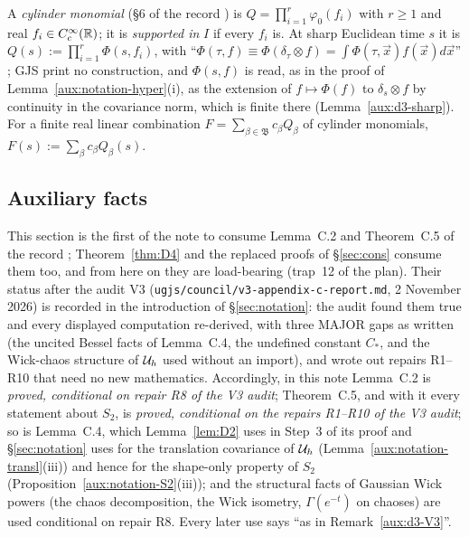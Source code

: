 A \emph{cylinder monomial} (\S6 of the record \cite[p.~19]{R}) is $Q=\prod_{i=1}^r\varphi_0(f_i)$
with $r\ge1$ and real $f_i\in C_c^\infty(\mathbb{R})$; it is \emph{supported in} $I$ if every $f_i$ is.
At sharp Euclidean time $s$ it is $Q(s):=\prod_{i=1}^r\Phi(s,f_i)$, with
``$\Phi(\tau,f)\equiv\Phi(\delta_\tau\otimes f)=\int\Phi(\tau,\vec x)f(\vec x)d\vec x$''
\cite[p.~589]{GJS}; GJS print no construction, and $\Phi(s,f)$ is read, as in the proof of
Lemma~\ref{aux:notation-hyper}(i), as the extension of $f\mapsto\Phi(f)$ to $\delta_s\otimes f$ by
continuity in the covariance norm, which is finite there (Lemma~\ref{aux:d3-sharp}).  For a finite
real linear combination $F=\sum_{\beta\in\mathfrak B}c_\beta Q_\beta$ of cylinder monomials,
$F(s):=\sum_\beta c_\beta Q_\beta(s)$.

\subsection{Auxiliary facts}\label{sub:d3-aux}

\begin{auxrem}\label{aux:d3-V3}
This section is the first of the note to consume Lemma~C.2 and Theorem~C.5 of the record
\cite[pp.~40--41]{R}; Theorem~\ref{thm:D4} and the replaced proofs of \S\ref{sec:cons} consume
them too, and from here on they are load-bearing (trap~12 of the plan).  Their status after the
audit V3 (\texttt{ugjs/council/}\allowbreak\texttt{v3-appendix-c-report.md}, 2 November 2026) is
recorded in the introduction of \S\ref{sec:notation}: the audit found them true and every
displayed computation re-derived, with three MAJOR gaps as written (the uncited Bessel facts of
Lemma~C.4, the undefined constant $C_*$, and the Wick-chaos structure of $\mathcal U_h$ used without an
import), and wrote out repairs R1--R10 that need no new mathematics.  Accordingly, in this note
Lemma~C.2 is \emph{proved, conditional on repair R8 of the V3 audit}; Theorem~C.5, and with it
every statement about $S_2$, is \emph{proved, conditional on the repairs R1--R10 of the V3
audit}; so is Lemma~C.4, which Lemma~\ref{lem:D2} uses in Step~3 of its proof and
\S\ref{sec:notation} uses for the translation covariance of $\mathcal U_h$
(Lemma~\ref{aux:notation-transl}(iii)) and hence for the shape-only property of $S_2$
(Proposition~\ref{aux:notation-S2}(iii)); and the structural facts of Gaussian Wick powers (the
chaos decomposition, the Wick isometry, $\Gamma(e^{-t})$ on chaoses) are used conditional on
repair R8.  Every later use says ``as in Remark~\ref{aux:d3-V3}''.
\end{auxrem}

